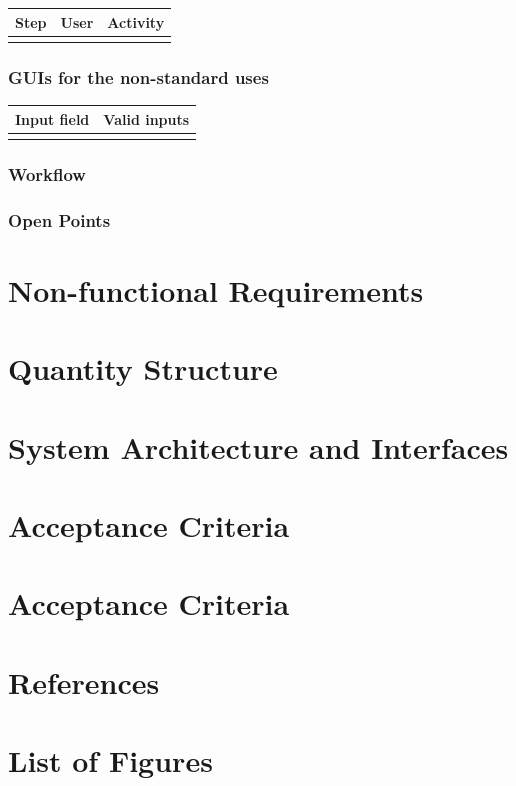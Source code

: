 \documentclass[12pt]{article}
\theoremstyle{definition}
\begin{document}
\begin{tabular}{|l|l|l|}
\hline
Step & User & Activity \\ \hline
 & & \\ \hline
\end{tabular}

\subsubsection{GUIs for the non-standard uses}

\begin{tabular}{|l|l|}
\hline
Input field & Valid inputs \\ \hline
 &  \\ \hline
\end{tabular}

\subsubsection{Workflow}

\subsubsection{Open Points}

\pagebreak

\section{Non-functional Requirements}

\pagebreak

\section{Quantity Structure}

\pagebreak

\section{System Architecture and Interfaces}

\pagebreak

\section{Acceptance Criteria}

\pagebreak

\section{Acceptance Criteria}

\pagebreak

\section{References}

\pagebreak

\section{List of Figures}

\pagebreak
\end{document}
